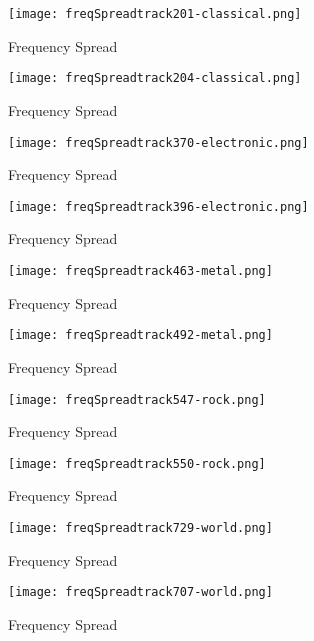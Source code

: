 \documentclass{article} %
\begin{document}
\begin{figure}[H]
\centering
\texttt{[image: freqSpreadtrack201-classical.png]}
\caption{Frequency Spread}
\label{fig:spread201}
\end{figure}

\begin{figure}[H]
\centering
\texttt{[image: freqSpreadtrack204-classical.png]}
\caption{Frequency Spread}
\label{fig:spread204}
\end{figure}

\begin{figure}[H]
\centering
\texttt{[image: freqSpreadtrack370-electronic.png]}
\caption{Frequency Spread}
\label{fig:spread370}
\end{figure}


\begin{figure}[H]
\centering
\texttt{[image: freqSpreadtrack396-electronic.png]}
\caption{Frequency Spread}
\label{fig:spread396}
\end{figure}


\begin{figure}[H]
\centering
\texttt{[image: freqSpreadtrack463-metal.png]}
\caption{Frequency Spread}
\label{fig:spread463}
\end{figure}


\begin{figure}[H]
\centering
\texttt{[image: freqSpreadtrack492-metal.png]}
\caption{Frequency Spread}
\label{fig:spread492}
\end{figure}


\begin{figure}[H]
\centering
\texttt{[image: freqSpreadtrack547-rock.png]}
\caption{Frequency Spread}
\label{fig:spread547}
\end{figure}


\begin{figure}[H]
\centering
\texttt{[image: freqSpreadtrack550-rock.png]}
\caption{Frequency Spread}
\label{fig:spread550}
\end{figure}


\begin{figure}[H]
\centering
\texttt{[image: freqSpreadtrack729-world.png]}
\caption{Frequency Spread}
\label{fig:spread729}
\end{figure}


\begin{figure}[H]
\centering
\texttt{[image: freqSpreadtrack707-world.png]}
\caption{Frequency Spread}
\label{fig:spread707}
\end{figure}
\end{document}
